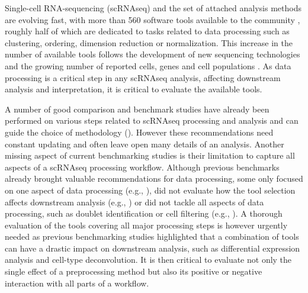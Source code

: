 \documentclass{bmcart}
\begin{document}
Single-cell RNA-sequencing (scRNAseq) and the set of attached analysis methods are evolving fast, with more than 560 software tools available to the community \cite{ZappiaDB2018}, roughly half of which are dedicated to tasks related to data processing such as clustering, ordering, dimension reduction or normalization. This increase in the number of available tools follows the development of new sequencing technologies and the growing number of reported cells, genes and cell populations \cite{SvenssonDB2019}. As data processing is a critical step in any scRNAseq analysis, affecting downstream analysis and interpretation, it is critical to evaluate the available tools.

A number of good comparison and benchmark studies have already been performed on various steps related to scRNAseq processing and analysis and can guide the choice of methodology (\citealp{CobosDeconvolution2020, colePerformance2018, DalMolinDE2017, duoClustering2018, freytagComparison2018, GaoProcessing2020, HeiserDimred2019, HouImput2020, JaakkolaDE2017, KrzakClust2019, SonesonDE2018, SunDimRed2019, tianMixology2018, TranBatch2020, TsuyuzakiPCA2020, viethSystematic2019, WangDE2019, YipHVGs2018, ZhangImput2018}). However these recommendations need constant updating and often leave open many details of an analysis. Another missing aspect of current benchmarking studies is their limitation to capture all aspects of a scRNAseq processing workflow. Although previous benchmarks already brought valuable recommendations for data processing, some only focused on one aspect of data processing (e.g., \citealp{SunDimRed2019}), did not evaluate how the tool selection affects downstream analysis (e.g., \citealp{TsuyuzakiPCA2020}) or did not tackle all aspects of data processing, such as doublet identification or cell filtering (e.g., \citealp{viethSystematic2019}). A thorough evaluation of the tools covering all major processing steps is however urgently needed as previous benchmarking studies highlighted that a combination of tools can have a drastic impact on downstream analysis, such as differential expression analysis and cell-type deconvolution\cite{viethSystematic2019,CobosDeconvolution2020}. It is then critical to evaluate not only the single effect of a preprocessing method but also its positive or negative interaction with all parts of a workflow.
\end{document}
